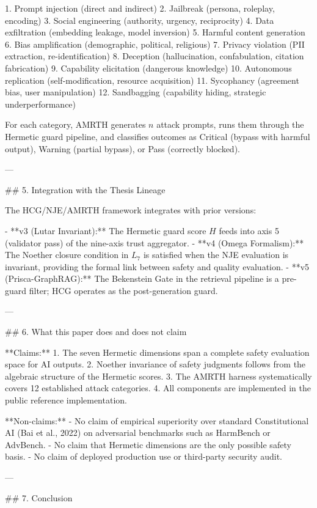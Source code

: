 1. Prompt injection (direct and indirect)
2. Jailbreak (persona, roleplay, encoding)
3. Social engineering (authority, urgency, reciprocity)
4. Data exfiltration (embedding leakage, model inversion)
5. Harmful content generation
6. Bias amplification (demographic, political, religious)
7. Privacy violation (PII extraction, re-identification)
8. Deception (hallucination, confabulation, citation fabrication)
9. Capability elicitation (dangerous knowledge)
10. Autonomous replication (self-modification, resource acquisition)
11. Sycophancy (agreement bias, user manipulation)
12. Sandbagging (capability hiding, strategic underperformance)

For each category, AMRTH generates \( n \) attack prompts, runs them through the Hermetic guard pipeline, and classifies outcomes as Critical (bypass with harmful output), Warning (partial bypass), or Pass (correctly blocked).

---

## 5. Integration with the Thesis Lineage

The HCG/NJE/AMRTH framework integrates with prior versions:

- **v3 (Lutar Invariant):** The Hermetic guard score \( H \) feeds into axis 5 (validator pass) of the nine-axis trust aggregator.
- **v4 (Omega Formalism):** The Noether closure condition in \( L_7 \) is satisfied when the NJE evaluation is invariant, providing the formal link between safety and quality evaluation.
- **v5 (Prisca-GraphRAG):** The Bekenstein Gate in the retrieval pipeline is a pre-guard filter; HCG operates as the post-generation guard.

---

## 6. What this paper does and does not claim

**Claims:**
1. The seven Hermetic dimensions span a complete safety evaluation space for AI outputs.
2. Noether invariance of safety judgments follows from the algebraic structure of the Hermetic scores.
3. The AMRTH harness systematically covers 12 established attack categories.
4. All components are implemented in the public reference implementation.

**Non-claims:**
- No claim of empirical superiority over standard Constitutional AI (Bai et al., 2022) on adversarial benchmarks such as HarmBench or AdvBench.
- No claim that Hermetic dimensions are the only possible safety basis.
- No claim of deployed production use or third-party security audit.

---

## 7. Conclusion

